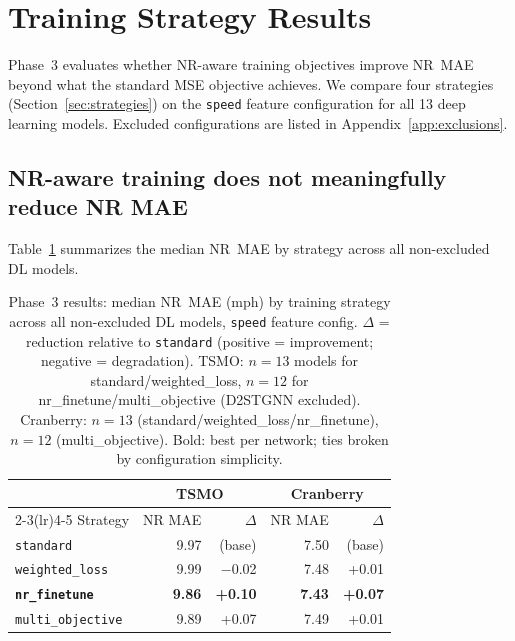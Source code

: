 \documentclass[a4paper]{cas-sc}
\begin{document}
\section{Training Strategy Results}
\label{sec:results_strategies}

Phase~3 evaluates whether NR-aware training objectives improve NR~MAE
beyond what the standard MSE objective achieves.
We compare four strategies (Section~\ref{sec:strategies}) on the
\texttt{speed} feature configuration for all 13 deep learning models.
Excluded configurations are listed in Appendix~\ref{app:exclusions}.

\subsection{NR-aware training does not meaningfully reduce NR MAE}

Table~\ref{tab:phase3_summary} summarizes the median NR~MAE by
strategy across all non-excluded DL models.

\begin{table}[htbp]
\centering
\caption{Phase~3 results: median NR~MAE (mph) by training strategy
         across all non-excluded DL models, \texttt{speed} feature config.
         $\Delta$ = reduction relative to \texttt{standard}
         (positive = improvement; negative = degradation).
         TSMO: $n{=}13$ models for standard/weighted\_loss,
         $n{=}12$ for nr\_finetune/multi\_objective (D2STGNN excluded).
         Cranberry: $n{=}13$ (standard/weighted\_loss/nr\_finetune), $n{=}12$ (multi\_objective).
         Bold: best per network; ties broken by configuration simplicity.}
\label{tab:phase3_summary}
\small
\begin{tabular}{lrr rr}
\toprule
 & \multicolumn{2}{c}{TSMO} & \multicolumn{2}{c}{Cranberry} \\
\cmidrule(lr){2-3}\cmidrule(lr){4-5}
Strategy & NR MAE & $\Delta$ & NR MAE & $\Delta$ \\
\midrule
\texttt{standard}                           & 9.97 & (base) & 7.50 & (base) \\
\texttt{weighted\_loss}                     & 9.99 & $-$0.02 & 7.48 & +0.01 \\
\textbf{\texttt{nr\_finetune}}              & \textbf{9.86} & \textbf{+0.10} & \textbf{7.43} & \textbf{+0.07} \\
\texttt{multi\_objective}                   & 9.89 & +0.07 & 7.49 & +0.01 \\
\bottomrule
\end{tabular}
\end{table}
\end{document}
